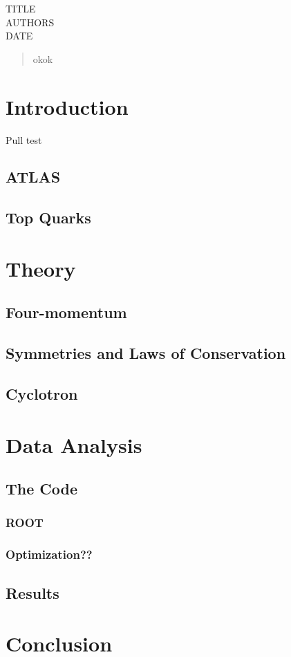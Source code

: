 \documentclass[11pt,a4paper]{article}
\begin{document}
TITLE\\
AUTHORS\\
DATE

\cleardoublepage{}
\begin{abstract}
  okok
\end{abstract}
\cleardoublepage{}
\tableofcontents{}
\section{Introduction}
Pull test

\subsection{ATLAS}

\subsection{Top Quarks}

\section{Theory}

\subsection{Four-momentum}

\subsection{Symmetries and Laws of Conservation}

\subsection{Cyclotron}

\section{Data Analysis}

\subsection{The Code}

\subsubsection{ROOT}

\subsubsection{Optimization??}

\subsection{Results}

\section{Conclusion}
\end{document}
